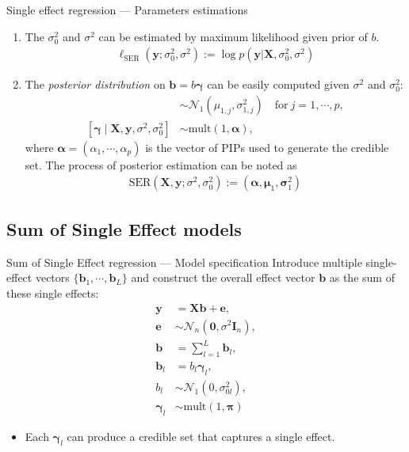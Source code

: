 \documentclass[10pt]{beamer}
\begin{document}
\begin{frame}{Single effect regression --- \normalsize Parameters estimations}
    \begin{enumerate}
        \item The $\sigma_0^2$ and $\sigma^2$ can be estimated by maximum likelihood given prior of $b$.
        \begin{gather}
            \ell_{\text{SER}}(\bm{y};\sigma_0^2,\sigma^2):=\log p(\bm{y}|\bm{X},\sigma_0^2,\sigma^2)\label{eq:sigmaml}
        \end{gather}
        \item The \textit{posterior distribution} on $\bm{b}=b\bm{\gamma}$ can be easily computed given $\sigma^2$ and $\sigma_0^2$:
        \begin{align}
            [b\mid\bm{X},\bm{y},\sigma^2,\sigma_0^2,\gamma_j=1]
            & \sim\mathcal{N}_1(\mu_{1,j},\sigma_{1,j}^2)\quad\text{for}\ j=1,\cdots,p, \\
            [\bm{\gamma}\mid\bm{X},\bm{y},\sigma^2,\sigma^2_0]
            & \sim\text{mult}(1,\bm{\alpha}),
        \end{align}
        where $\bm{\alpha}=(\alpha_1,\cdots,\alpha_p)$ is the vector of PIPs used to generate the credible set.
        The process of posterior estimation can be noted as
        \begin{gather}
            \text{SER}(\bm{X},\bm{y};\sigma^2,\sigma_0^2) := (\bm{\alpha},\bm{\mu}_1,\bm{\sigma}_1^2)
        \end{gather}
    \end{enumerate}
    
\end{frame}






\subsection{Sum of Single Effect models}

\begin{frame}{Sum of Single Effect regression --- \normalsize Model specification}
    Introduce multiple single-effect vectors $\{\bm{b}_1,\cdots,\bm{b}_L\}$ and 
    construct the overall effect vector $\bm{b}$ as the sum of these single effects:
    \begin{align}
        \bm{y} & = \bm{Xb} + \bm{e},\label{eq:susieA1}\\
        \bm{e} & \sim \mathcal{N}_n(\bm{0},\sigma^2\bm{I}_n),\\
        \bm{b} & = \sum_{l=1}^L\bm{b}_l,\\
        \bm{b}_l & = b_l\bm{\gamma}_l, \\
        b_l & \sim \mathcal{N}_1(0,\sigma_{0l}^2), \\
        \bm{\gamma}_l & \sim \text{mult}(1,\bm{\pi})\label{eq:susieA6}
    \end{align}
    \begin{itemize}
        \item Each $\bm{\gamma}_l$ can produce a credible set that captures a single effect.
    \end{itemize}
\end{frame}
\end{document}
